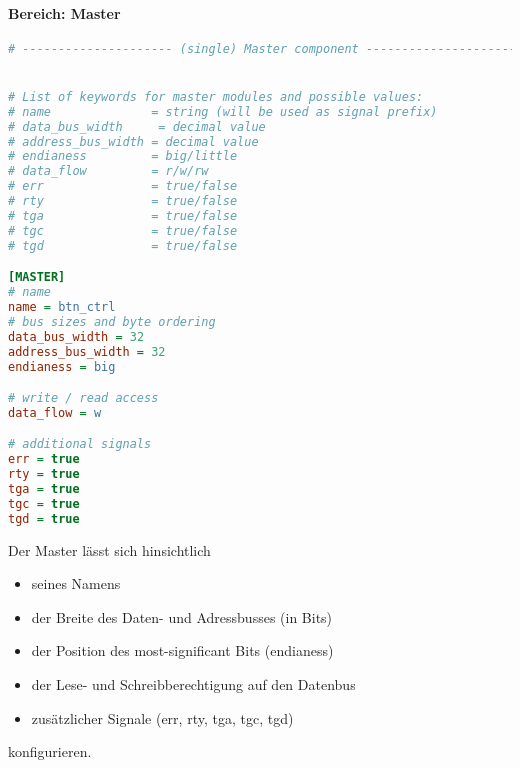 \documentclass{article}
\newcommand{\nl}{\leavevmode\newline}
\begin{document}
\paragraph{Bereich: Master}\nl
\begin{lstlisting}[language={Ini},frame=single]
# --------------------- (single) Master component ---------------------


# List of keywords for master modules and possible values:
# name              = string (will be used as signal prefix)
# data_bus_width     = decimal value
# address_bus_width = decimal value
# endianess         = big/little
# data_flow         = r/w/rw
# err               = true/false
# rty               = true/false
# tga               = true/false
# tgc               = true/false
# tgd               = true/false

[MASTER]
# name
name = btn_ctrl
# bus sizes and byte ordering
data_bus_width = 32
address_bus_width = 32
endianess = big

# write / read access
data_flow = w

# additional signals
err = true
rty = true
tga = true
tgc = true
tgd = true
\end{lstlisting}
Der Master lässt sich hinsichtlich 
\begin{itemize}
\item seines Namens
\item der Breite des Daten- und Adressbusses (in Bits)
\item der Position des most-significant Bits (endianess)
\item der Lese- und Schreibberechtigung auf den Datenbus
\item zusätzlicher Signale (err, rty, tga, tgc, tgd)
\end{itemize}
konfigurieren.
\newpage
\end{document}

